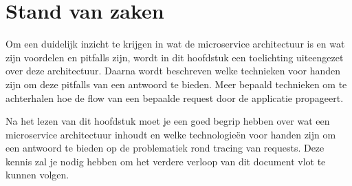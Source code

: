 \chapter{Stand van zaken}
\label{ch:stand-van-zaken}






Om een duidelijk inzicht te krijgen in wat de microservice architectuur is en wat zijn voordelen en pitfalls zijn, wordt in dit hoofdstuk een toelichting uiteengezet over deze architectuur. Daarna wordt beschreven welke technieken voor handen zijn om deze pitfalls van een antwoord te bieden. Meer bepaald technieken om te achterhalen hoe de flow van een bepaalde request door de applicatie propageert. 

Na het lezen van dit hoofdstuk moet je een goed begrip hebben over wat een microservice architectuur inhoudt en welke technologieën voor handen zijn om een antwoord te bieden op de problematiek rond tracing van requests. Deze kennis zal je nodig hebben om het verdere verloop van dit document vlot te kunnen volgen.

